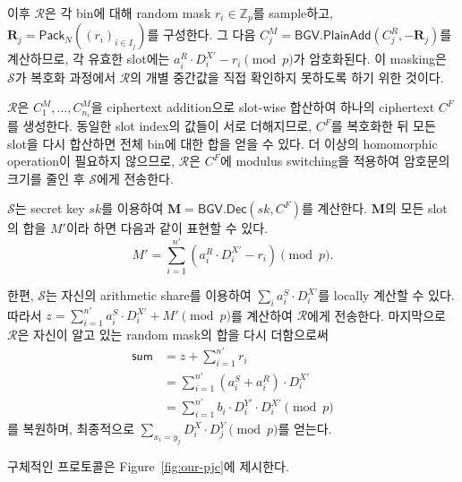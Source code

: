 \documentclass[sigconf,anonymous,review]{acmart}
\begin{document}
이후 $\mathcal{R}$은 각 bin에 대해 random mask
$r_i\in\mathbb{Z}_p$를 sample하고,
$\mathbf{R}_j=\mathsf{Pack}_N((r_i)_{i\in I_j})$를 구성한다.
그 다음
$C_j^M=\mathsf{BGV.PlainAdd}(C_j^R,-\mathbf{R}_j)$를 계산하므로,
각 유효한 slot에는
$a_i^R\cdot D_i^{X'}-r_i\pmod p$가 암호화된다.
이 masking은 $\mathcal{S}$가 복호화 과정에서
$\mathcal{R}$의 개별 중간값을 직접 확인하지 못하도록 하기 위한 것이다.

$\mathcal{R}$은 $C_1^M,\ldots,C_{n_c}^M$을 ciphertext addition으로
slot-wise 합산하여 하나의 ciphertext $C^F$를 생성한다.
동일한 slot index의 값들이 서로 더해지므로, $C^F$를 복호화한 뒤
모든 slot을 다시 합산하면 전체 bin에 대한 합을 얻을 수 있다.
더 이상의 homomorphic operation이 필요하지 않으므로,
$\mathcal{R}$은 $C^F$에 modulus switching을 적용하여 암호문의 크기를 줄인 후
$\mathcal{S}$에게 전송한다.

$\mathcal{S}$는 secret key $sk$를 이용하여
$\mathbf{M}=\mathsf{BGV.Dec}(sk,C^F)$를 계산한다.
$\mathbf{M}$의 모든 slot의 합을 $M'$이라 하면 다음과 같이 표현할 수 있다.
\[
M'
=
\sum_{i=1}^{n'}
\left(
a_i^R\cdot D_i^{X'}-r_i
\right)
\pmod p.
\]

한편, $\mathcal{S}$는 자신의 arithmetic share를 이용하여
$\sum_i a_i^S\cdot D_i^{X'}$를 locally 계산할 수 있다.
따라서
$z=\sum_{i=1}^{n'}a_i^S\cdot D_i^{X'}+M'\pmod p$를 계산하여
$\mathcal{R}$에게 전송한다.
마지막으로 $\mathcal{R}$은 자신이 알고 있는 random mask의 합을
다시 더함으로써
\[
\begin{aligned}
\mathsf{sum}
&=
z+\sum_{i=1}^{n'}r_i\\
&=
\sum_{i=1}^{n'}
(a_i^S+a_i^R)\cdot D_i^{X'}\\
&=
\sum_{i=1}^{n'}
b_i\cdot D_i^{Y'}\cdot D_i^{X'}
\pmod p
\end{aligned}
\]
를 복원하며, 최종적으로
$\sum_{x_i=y_j}D_i^X\cdot D_j^Y\pmod p$를 얻는다.

구체적인 프로토콜은 Figure~\ref{fig:our-pjc}에 제시한다.
\end{document}

